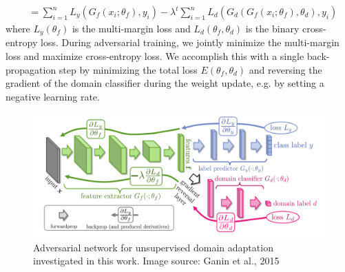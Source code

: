 \documentclass{sigkddExp}
\begin{document}
\begin{itemize}[topsep=0pt,itemsep=-1ex,partopsep=1ex,parsep=1ex]
    \begin{equation}
    \left.\begin{aligned}
     &= \sum_{i=1}^{n}L_y(G_f(x_i;\theta_f), y_i) 
      - \lambda^{t} \sum_{i=1}^{n}L_d(G_d(G_f(x_i;\theta_f), \theta_d), y_i)
    \end{aligned}\right.
    \end{equation}
    where $L_y(\theta_f)$ is the multi-margin loss and $L_d(\theta_f, \theta_d)$ is the binary cross-entropy loss. During adversarial training, we jointly minimize the multi-margin loss and maximize cross-entropy loss. We accomplish this with a single back-propagation step by minimizing the total loss $E(\theta_f, \theta_d)$ and reversing the gradient of the domain classifier during the weight update, e.g. by setting a negative learning rate.
\end{itemize}


\begin{figure}[t]
\centering
\includegraphics[width=\columnwidth]{img/adversary}
\caption{Adversarial network for unsupervised domain adaptation investigated in this work. Image source: Ganin et al., 2015 \protect\cite{ganin2015unsupervised}}
\label{fig:adversarial}
\end{figure}
 
\end{document}
